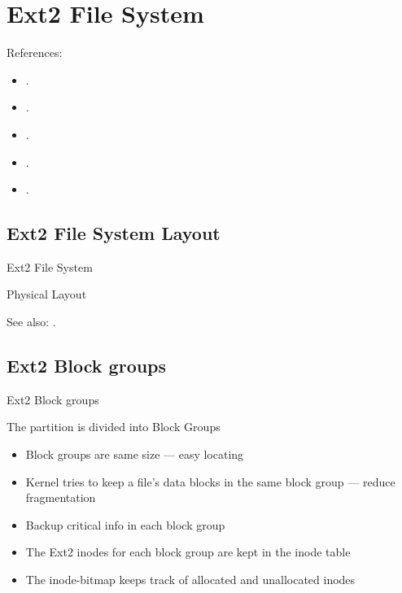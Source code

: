 \section{Ext2 File System}

References:
\begin{itemize}
\item {}.
\item {}.
\item {}.
\item {}.
\item {}.
\end{itemize}

\subsection{Ext2 File System Layout}

\begin{frame}{Ext2 File System}
  \begin{iblock}{Physical Layout}
    \begin{center}
    \end{center}
  \end{iblock}
\end{frame}

See also: .

\subsection{Ext2 Block groups}

\begin{frame}{Ext2 Block groups}
  \begin{block}{The partition is divided into \alert{Block Groups}}
    \begin{itemize}
    \item Block groups are same size --- easy locating
    \item Kernel tries to keep a file's data blocks in the same block group --- reduce
      fragmentation
    \item Backup critical info in each block group
    \item The Ext2 inodes for each block group are kept in the \alert{inode
        table}
    \item The \alert{inode-bitmap} keeps track of allocated and unallocated
      inodes
    \end{itemize}
  \end{block}
\end{frame}

